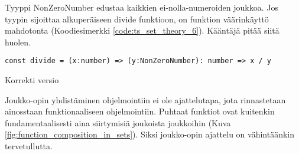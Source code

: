 Tyyppi NonZeroNumber edustaa kaikkien ei-nolla-numeroiden joukkoa. Jos tyypin sijoittaa alkuperäiseen divide funktioon, on funktion väärinkäyttö mahdotonta (Koodiesimerkki \ref{code:ts_set_theory_6}). Kääntäjä pitää siitä huolen.


\begin{code}
    \begin{verbatim}
const divide = (x:number) => (y:NonZeroNumber): number => x / y
\end{verbatim}
    \caption{Korrekti versio}
    \label{code:ts_set_theory_6}
\end{code}

Joukko-opin yhdistäminen ohjelmointiin ei ole ajattelutapa, jota rinnastetaan ainosstaan funktionaaliseen ohjelmointiin. Puhtaat funktiot ovat kuitenkin fundamentaalisesti aina siirtymisiä joukoista joukkoihin (Kuva \ref{fig:function_composition_in_sets}). Siksi joukko-opin ajattelu on vähintäänkin tervetullutta.

